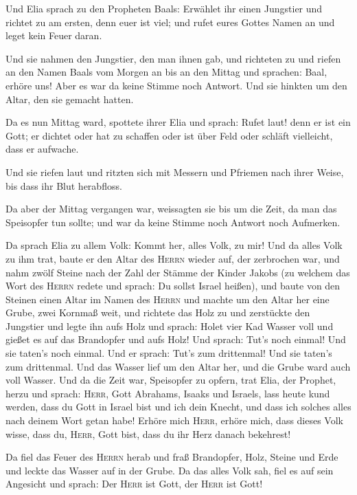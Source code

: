  Und Elia sprach zu den Propheten Baals: Erwählet ihr
einen Jungstier und richtet zu am ersten, denn euer ist viel; und rufet
eures Gottes Namen an und leget kein Feuer daran.

 Und sie nahmen den Jungstier, den man ihnen gab, und
richteten zu und riefen an den Namen Baals vom Morgen an bis an den
Mittag und sprachen: Baal, erhöre uns! Aber es war da keine Stimme noch
Antwort. Und sie hinkten um den Altar, den sie gemacht hatten.

 Da es nun Mittag ward, spottete ihrer Elia und sprach:
Rufet laut! denn er ist ein Gott; er dichtet oder hat zu schaffen oder
ist über Feld oder schläft vielleicht, dass er aufwache.

 Und sie riefen laut und ritzten sich mit Messern und
Pfriemen nach ihrer Weise, bis dass ihr Blut herabfloss.

 Da aber der Mittag vergangen war, weissagten sie bis um
die Zeit, da man das Speisopfer tun sollte; und war da keine Stimme noch
Antwort noch Aufmerken.

 Da sprach Elia zu allem Volk: Kommt her, alles Volk, zu
mir! Und da alles Volk zu ihm trat, baute er den Altar des
\textsc{Herrn} wieder auf, der zerbrochen war,  und nahm
zwölf Steine nach der Zahl der Stämme der Kinder Jakobs (zu welchem das
Wort des \textsc{Herrn} redete und sprach: Du sollst Israel heißen),
 und baute von den Steinen einen Altar im Namen des
\textsc{Herrn} und machte um den Altar her eine Grube, zwei Kornmaß
weit,  und richtete das Holz zu und zerstückte den
Jungstier und legte ihn aufs Holz  und sprach: Holet vier
Kad Wasser voll und gießet es auf das Brandopfer und aufs Holz! Und
sprach: Tut's noch einmal! Und sie taten's noch einmal. Und er sprach:
Tut's zum drittenmal! Und sie taten's zum drittenmal. 
Und das Wasser lief um den Altar her, und die Grube ward auch voll
Wasser.  Und da die Zeit war, Speisopfer zu opfern, trat
Elia, der Prophet, herzu und sprach: \textsc{Herr}, Gott Abrahams,
Isaaks und Israels, lass heute kund werden, dass du Gott in Israel bist
und ich dein Knecht, und dass ich solches alles nach deinem Wort getan
habe!  Erhöre mich \textsc{Herr}, erhöre mich, dass
dieses Volk wisse, dass du, \textsc{Herr}, Gott bist, dass du ihr Herz
danach bekehrest!

 Da fiel das Feuer des \textsc{Herrn} herab und fraß
Brandopfer, Holz, Steine und Erde und leckte das Wasser auf in der
Grube.  Da das alles Volk sah, fiel es auf sein Angesicht
und sprach: Der \textsc{Herr} ist Gott, der \textsc{Herr} ist Gott!

